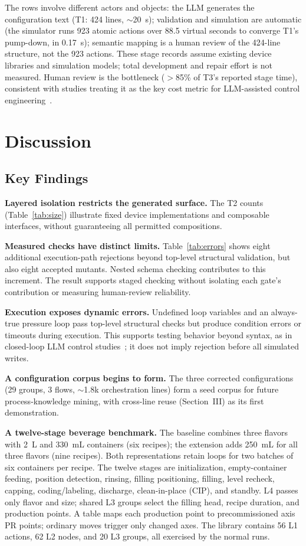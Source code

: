 \documentclass[conference]{IEEEtran}
\begin{document}
The rows involve different actors and objects: the LLM generates the configuration text (T1: 424 lines, $\sim$20~s); validation and simulation are automatic (the simulator runs 923 atomic actions over 88.5 virtual seconds to converge T1's pump-down, in 0.17~s); semantic mapping is a human review of the 424-line structure, not the 923 actions. These stage records assume existing device libraries and simulation models; total development and repair effort is not measured. Human review is the bottleneck ($>$85\% of T3's reported stage time), consistent with studies treating it as the key cost metric for LLM-assisted control engineering~\cite{agents4plc}.

\section{Discussion}

\subsection{Key Findings}

\textbf{Layered isolation restricts the generated surface.} The T2 counts (Table~\ref{tab:size}) illustrate fixed device implementations and composable interfaces, without guaranteeing all permitted compositions.

\textbf{Measured checks have distinct limits.} Table~\ref{tab:errors} shows eight additional execution-path rejections beyond top-level structural validation, but also eight accepted mutants. Nested schema checking contributes to this increment. The result supports staged checking without isolating each gate's contribution or measuring human-review reliability.

\textbf{Execution exposes dynamic errors.} Undefined loop variables and an always-true pressure loop pass top-level structural checks but produce condition errors or timeouts during execution. This supports testing behavior beyond syntax, as in closed-loop LLM control studies~\cite{wen}; it does not imply rejection before all simulated writes.

\textbf{A configuration corpus begins to form.} The three corrected configurations (29 groups, 3 flows, $\sim$1.8k orchestration lines) form a seed corpus for future process-knowledge mining, with cross-line reuse (Section~III) as its first demonstration.

\textbf{A twelve-stage beverage benchmark.} The baseline combines three flavors with 2~L and 330~mL containers (six recipes); the extension adds 250~mL for all three flavors (nine recipes). Both representations retain loops for two batches of six containers per recipe. The twelve stages are initialization, empty-container feeding, position detection, rinsing, filling positioning, filling, level recheck, capping, coding/labeling, discharge, clean-in-place (CIP), and standby. L4 passes only flavor and size; shared L3 groups select the filling head, recipe duration, and production points. A table maps each production point to precommissioned axis PR points; ordinary moves trigger only changed axes. The library contains 56 L1 actions, 62 L2 nodes, and 20 L3 groups, all exercised by the normal runs.
\end{document}
